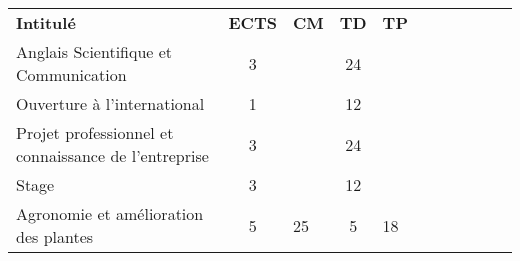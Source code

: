 


\renewcommand{\arraystretch}{1.5}%
\begin{tabular}{|m{5cm}|cm{0.75cm}|cm{0.75cm}|cm{0.75cm}|cm{0.75cm}|cm{0.75cm}|}
\cline{1-5}

\cellcolor{couleurFonce} \color{white}\bfseries Intitul\'e & \cellcolor{couleurFonce} \color{white}\bfseries ECTS & \cellcolor{couleurFonce} \color{white}\bfseries CM & \cellcolor{couleurFonce} \color{white}\bfseries TD & \cellcolor{couleurFonce} \color{white}\bfseries TP \\ \cline{1-5}
 \color{black} Anglais Scientifique et Communication & \color{black} 3 & \color{black} & \color{black} 24 & \color{black} \\ \cline{1-5}

 \cellcolor{couleurClaire} \color{couleurTexte} Ouverture à l'international & \cellcolor{couleurClaire} \color{couleurTexte} 1 & \cellcolor{couleurClaire} \color{couleurTexte} & \cellcolor{couleurClaire} \color{couleurTexte} 12 & \cellcolor{couleurClaire} \color{couleurTexte} \\ \cline{1-5}

 \color{black} Projet professionnel et connaissance de l'entreprise & \color{black} 3 & \color{black} & \color{black} 24 & \color{black} \\ \cline{1-5}

 \cellcolor{couleurClaire} \color{couleurTexte} Stage  & \cellcolor{couleurClaire} \color{couleurTexte} 3 & \cellcolor{couleurClaire} \color{couleurTexte} & \cellcolor{couleurClaire} \color{couleurTexte} 12 & \cellcolor{couleurClaire} \color{couleurTexte} 
\\ \cline{1-5}

 \color{black} Agronomie et amélioration des plantes & \color{black} 5 & \color{black} 25 & \color{black} 5 & \color{black} 18 \\ \cline{1-5}


\end{tabular}
